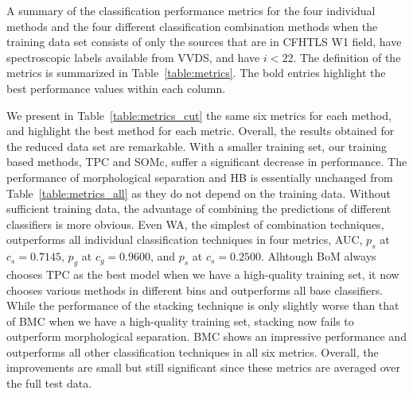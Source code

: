 \documentclass[useAMS,usenatbib]{mn2e}
\begin{document}
\begin{table}
  \caption{A summary of the classification performance metrics
           for the four individual methods
           and the four different classification combination methods
           when the training data set consists of
           only the sources that are in CFHTLS W1 field,
           have spectroscopic labels available from VVDS,
           and have $i < 22$.
           The definition of the metrics is summarized in
           Table~\ref{table:metrics}.
           The bold entries highlight the best performance values
           within each column.}
  \centering
  
  \label{table:metrics_cut}
\end{table}

We present in Table~\ref{table:metrics_cut}
the same six metrics for each method,
and highlight the best method for each metric.
Overall, the results obtained for the reduced data set are remarkable.
With a smaller training set, our training based methods, TPC and SOMc,
suffer a significant decrease in performance.
The performance of morphological separation and HB
is essentially unchanged from Table~\ref{table:metrics_all}
as they do not depend on the training data.
Without sufficient training data,
the advantage of combining the predictions of different classifiers
is more obvious.
Even WA, the simplest of combination techniques, outperforms
all individual classification techniques in four metrics,
AUC, $p_s$ at $c_s=0.7145$, $p_g$ at $c_g=0.9600$, and $p_s$ at $c_s=0.2500$.
Alhtough BoM always chooses TPC as the best model
when we have a high-quality training set,
it now chooses various methods in different bins
and outperforms all base classifiers.
While the performance of the stacking technique is only slightly worse
than that of BMC when we have a high-quality training set,
stacking now fails to outperform morphological separation.
BMC shows an impressive performance and 
outperforms all other classification techniques in all six metrics.
Overall, the improvements are small but still significant
since these metrics are averaged over the full test data.

\end{document}
